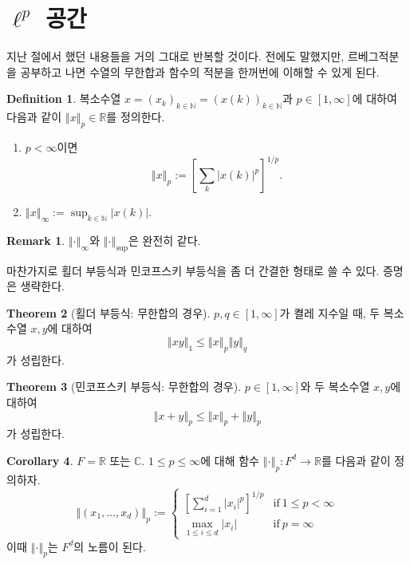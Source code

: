 \documentclass[11pt]{book}
\numberwithin{equation}{chapter}
\def\NN{\mathbb{N}}
\def\RR{\mathbb{R}}
\def\CC{\mathbb{C}}
\newcommand{\abs}[1]{\left\vert#1\right\vert}
\newcommand{\norm}[1]{\left\Vert#1\right\Vert}
\newcommand{\sqbracket}[1]{\left[#1\right]}
\def\textif{\text{if}}
\theoremstyle{definition}
\newtheorem{thm}{Theorem}[section]
\newtheorem{cor}[thm]{Corollary}
\newtheorem{defn}[thm]{Definition}
\newtheorem*{rem}{Remark}
\newenvironment{enum}
	{\begin{enumerate}[label=(\alph*), leftmargin=2\parindent]}
	{\end{enumerate}}
\begin{document}
\section{\(\ell^p\) 공간} \label{sec13.4}

지난 절에서 했던 내용들을 거의 그대로 반복할 것이다. 전에도 말했지만, 르베그적분을 공부하고 나면 수열의 무한합과 함수의 적분을 한꺼번에 이해할 수 있게 된다.

\begin{defn}
    복소수열 \(x = (x_k)_{k \in \NN} = (x(k))_{k \in \NN}\)과 \(p \in [1, \infty]\)에 대하여 다음과 같이 \(\norm{x}_{p} \in \RR\)를 정의한다.
    \begin{enum}
        \item \(p < \infty\)이면
        \[
        \norm{x}_p := \sqbracket{\sum_k \abs{x(k)}^p}^{1/p}.
        \]
        \item \(\norm{x}_{\infty} := \sup_{k \in \NN} \abs{x(k)}\).
    \end{enum}
\end{defn}
\begin{rem}
    \(\norm{\cdot}_{\infty}\)와 \(\norm{\cdot}_{\sup}\)은 완전히 같다.
\end{rem}

마찬가지로 횔더 부등식과 민코프스키 부등식을 좀 더 간결한 형태로 쓸 수 있다. 증명은 생략한다.

\begin{thm}[횔더 부등식: 무한합의 경우]
    \(p, q \in [1, \infty]\)가 켤레 지수일 때, 두 복소수열 \(x, y\)에 대하여
    \[
    \norm{xy}_{1} \le \norm{x}_p \norm{y}_q    
    \]
    가 성립한다.
\end{thm}

\begin{thm}[민코프스키 부등식: 무한합의 경우]
    \(p \in [1, \infty]\)와 두 복소수열 \(x, y\)에 대하여
    \[
    \norm{x + y}_p \le \norm{x}_p + \norm{y}_p    
    \]
    가 성립한다.
\end{thm}

\begin{cor}
    \(F = \RR\) 또는 \(\CC\). \(1 \le p \le \infty\)에 대해 함수 \(\norm{\cdot}_p : F^d \to \RR\)를 다음과 같이 정의하자.
    \[
        \norm{(x_1, \ldots, x_d)}_p :=
        \begin{cases}
            \displaystyle
            \sqbracket{\sum_{i=1}^d \abs{x_i}^p}^{1/p} &\textif \ 1 \le p < \infty\\
            \displaystyle
            \max_{1 \le i \le d} \abs{x_i} &\textif \ p = \infty
        \end{cases}
    \]
    이때 \(\norm{\cdot}_p\)는 \(F^d\)의 노름이 된다.
\end{cor}
\end{document}
